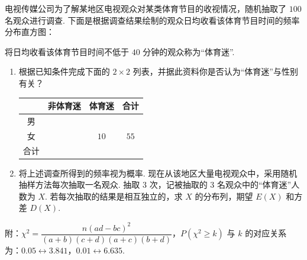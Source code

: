 \begin{problem}
电视传媒公司为了解某地区电视观众对某类体育节目的收视情况，随机抽取了 \(100\) 名观众进行调查. 下面是根据调查结果绘制的观众日均收看该体育节目时间的频率分布直方图：

将日均收看该体育节目时间不低于 \(40\) 分钟的观众称为“体育迷”.

\begin{enumerate}
\item 根据已知条件完成下面的 \(2 \times 2\) 列表，并据此资料你是否认为“体育迷”与性别有关？

\begin{center}
\begin{tabular}{|c|c|c|c|}
\hline
 & 非体育迷 & 体育迷 & 合计 \\
\hline
男 &  &  &  \\
\hline
女 &  & \(10\) & \(55\) \\
\hline
合计 &  &  &  \\
\hline
\end{tabular}
\end{center}

\item 将上述调查所得到的频率视为概率. 现在从该地区大量电视观众中，采用随机抽样方法每次抽取一名观众. 抽取 \(3\) 次，记被抽取的 \(3\) 名观众中的“体育迷”人数为 \(X\). 若每次抽取的结果是相互独立的，求 \(X\) 的分布列，期望 \(E(X)\) 和方差 \(D(X)\).
\end{enumerate}

附：\(\chi^2 = \dfrac{n(ad-bc)^2}{(a+b)(c+d)(a+c)(b+d)}\)，\(P(\chi^2 \geqslant k)\) 与 \(k\) 的对应关系为：\(0.05 \leftrightarrow 3.841\)，\(0.01 \leftrightarrow 6.635\).

\end{problem}

